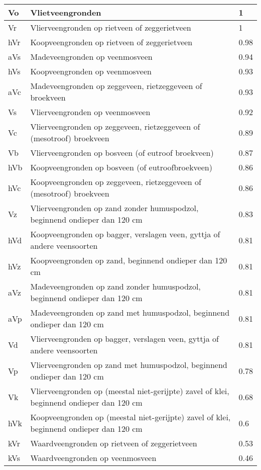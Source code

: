 \documentclass[a4paper,12pt]{scrbook}
\begin{document}
\begin{appendices}
\begin{center}
\begin{longtable}{|l| p{11cm} | l |}
Vo & Vlietveengronden  & 1 \\ \hline
Vr & Vlierveengronden op rietveen of zeggerietveen  & 1 \\ \hline
hVr & Koopveengronden op rietveen of zeggerietveen  & 0.98 \\ \hline
aVs & Madeveengronden op veenmosveen  & 0.94 \\ \hline
hVs & Koopveengronden op veenmosveen  & 0.93 \\ \hline
aVc & Madeveengronden op zeggeveen, rietzeggeveen of broekveen  & 0.93 \\ \hline
Vs & Vlierveengronden op veenmosveen  & 0.92 \\ \hline
Vc & Vlierveengronden op zeggeveen, rietzeggeveen of (mesotroof) broekveen  & 0.89 \\ \hline
Vb & Vlierveengronden op bosveen (of eutroof broekveen)  & 0.87 \\ \hline
hVb & Koopveengronden op bosveen (of eutroofbroekveen)  & 0.86 \\ \hline
hVc & Koopveengronden op zeggeveen, rietzeggeveen of (mesotroof) broekveen  & 0.86 \\ \hline
Vz & Vlierveengronden op zand zonder humuspodzol, beginnend ondieper dan 120 cm  & 0.83 \\ \hline
hVd & Koopveengronden op bagger, verslagen veen, gyttja of andere veensoorten  & 0.81 \\ \hline
hVz & Koopveengronden op zand, beginnend ondieper dan 120 cm  & 0.81 \\ \hline
aVz & Madeveengronden op zand zonder humuspodzol, beginnend ondieper dan 120 cm  & 0.81 \\ \hline
aVp & Madeveengronden op zand met humuspodzol, beginnend ondieper dan 120 cm  & 0.81 \\ \hline
Vd & Vlierveengronden op bagger, verslagen veen, gyttja of andere veensoorten & 0.81 \\ \hline
Vp & Vlierveengronden op zand met humuspodzol, beginnend ondieper dan 120 cm  & 0.78 \\ \hline
Vk & Vlierveengronden op (meestal niet-gerijpte) zavel of klei, beginnend ondieper dan 120 cm  & 0.68 \\ \hline
hVk & Koopveengronden op (meestal niet-gerijpte) zavel of klei, beginnend ondieper dan 120 cm  & 0.6 \\ \hline
kVr & Waardveengronden op rietveen of zeggerietveen  & 0.53 \\ \hline
kVs & Waardveengronden op veenmosveen  & 0.46 \\ \hline

\end{longtable}
\end{center}
\end{appendices}
\end{document}
